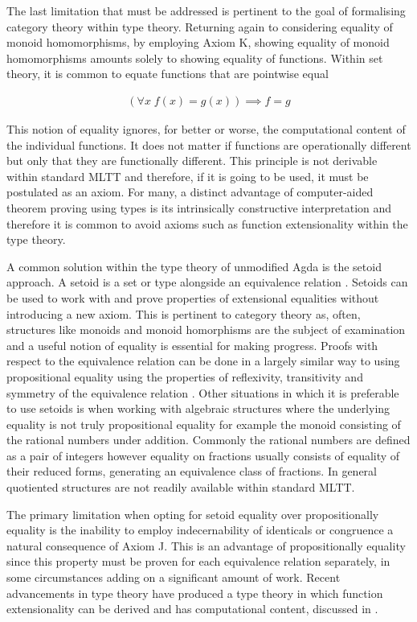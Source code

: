 The last limitation that must be addressed is pertinent to the goal of
formalising category theory within type theory. Returning again to considering
equality of monoid homomorphisms, by employing \textsf{Axiom K}, showing
equality of monoid homomorphisms amounts solely to showing equality of
functions. Within set theory, it is common to equate functions that are
pointwise equal

\begin{align*}
    (\forall x \; f(x) = g(x)) \implies f=g
\end{align*}

This notion of equality ignores, for better or worse, the computational content
of the individual functions. It does not matter if functions are operationally
different but only that they are functionally different. This principle is not
derivable within standard MLTT and therefore, if it is going to be used, it must
be postulated as an axiom. For many, a distinct advantage of computer-aided
theorem proving using types is its intrinsically constructive interpretation and
therefore it is common to avoid axioms such as function extensionality within
the type theory.


A common solution within the type theory of unmodified Agda is the setoid
approach. A setoid is a set or type alongside an equivalence relation . Setoids can be used to work with and prove properties of
extensional equalities without introducing a new axiom. This is pertinent to
category theory as, often, structures like monoids and monoid homorphisms are
the subject of examination and a useful notion of equality is essential for
making progress. Proofs with respect to the equivalence relation can be done in
a largely similar way to using propositional equality using the properties of
reflexivity, transitivity and symmetry of the equivalence relation .  Other situations in which it is preferable to use setoids is when
working with algebraic structures where the underlying equality is not truly
propositional equality for example the monoid consisting of the rational numbers
under addition. Commonly the rational numbers are defined as a pair of integers
however equality on fractions usually consists of equality of their reduced
forms, generating an equivalence class of fractions. In general quotiented
structures are not readily available within standard MLTT.

The primary limitation when opting for setoid equality over propositionally
equality is the inability to employ indecernability of identicals or congruence
a natural consequence of \textsf{Axiom J}. This is an advantage of
propositionally equality since this property must be proven for each equivalence
relation separately, in some circumstances adding on a significant amount of
work. Recent advancements in type theory have produced a type theory in which
function extensionality can be derived and has computational content, discussed
in .

